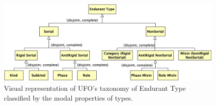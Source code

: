 \documentclass{article}
\newcommand{\me}[1]{\textsf{#1}}
\begin{document}
\begin{figure}[ht]
    \centering
    \includegraphics[width=\textwidth]{diagrams/Endurant_Type_Properties_Diagram.png}
    \caption{Visual representation of UFO's taxonomy of \me{Endurant Type} classified by the modal properties of types.}
    \label{fig:05_taxonomy_endurant_types_properties}
\end{figure}
\end{document}
